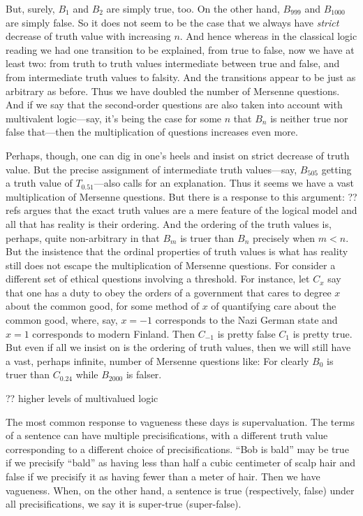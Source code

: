 But, surely, $B_1$ and $B_2$ are simply true, too. On the other hand, $B_{999}$ and $B_{1000}$ are simply false. So it does not seem to be the case
that we always have \textit{strict} decrease of truth value with increasing $n$. And hence whereas in the
classical logic reading we had one transition to be explained, from true to false, now we have at least two: from truth to truth values intermediate
between true and false, and from intermediate truth values to falsity. And the transitions appear to be just as arbitrary as before. Thus we have doubled 
the number of Mersenne questions. And if we say that the second-order questions are also taken into account with multivalent logic---say, it's being
the case for some $n$ that $B_n$ is neither true nor false that---then the multiplication of questions increases even more.

Perhaps, though, one can dig in one's heels and insist on strict decrease of truth value. But the precise assignment of 
intermediate truth values---say, $B_{505}$ getting a truth value of $T_{0.51}$---also calls for an explanation. Thus it seems we have a vast multiplication
of Mersenne questions. But there is a response to this argument: ??refs argues that 
the exact truth values are a mere feature of the logical model and all that has reality is their ordering. And
the ordering of the truth values is, perhaps, quite non-arbitrary in that $B_{m}$ is truer than $B_n$ precisely when $m<n$. But the insistence that the ordinal
properties of truth values is what has reality still does not escape the multiplication of Mersenne questions. For consider a different set of ethical
questions involving a threshold. For instance, let $C_x$ say that one has a duty to obey the orders of a government that cares to degree $x$ about the common
good, for some method of $x$ of quantifying care about the common good, where, say, $x=-1$ corresponds to the Nazi German state and $x=1$ corresponds to modern
Finland. Then $C_{-1}$ is pretty false $C_1$ is pretty true. But even if all we insist on is the ordering of truth values, then we will still have a vast,
perhaps infinite, number of Mersenne  questions like: 
For clearly $B_0$ is truer than $C_{0.24}$ while $B_{2000}$ is falser.

?? higher levels of multivalued logic

The most common response to vagueness these days is supervaluation. The terms of a sentence can have multiple precisifications,
with a different truth value corresponding to a different choice of precisifications. ``Bob is bald'' may be
true if we precisify ``bald'' as having less than half a cubic centimeter of scalp hair and false if we precisify it as
having fewer than a meter of hair. Then we have vagueness. When, on the other hand, a sentence is true (respectively, false) under all precisifications,
we say it is super-true (super-false).

